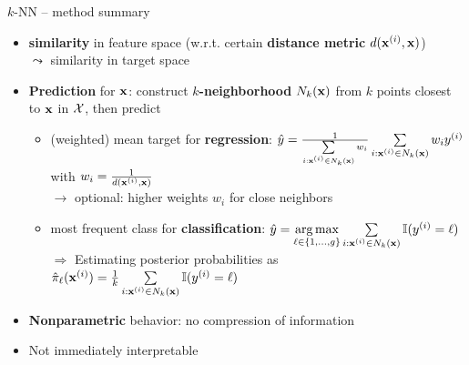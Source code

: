 \begin{frame}{$k$-NN -- method summary}

   
   

  \begin{itemize}
    \item \textbf{similarity} in feature space (w.r.t. certain \textbf{distance metric} $d(\mathbf{x}^{(i)},\mathbf{x})$) \\$\leadsto$ similarity in target space 
    \item \textbf{Prediction} for $\mathbf{x}$: construct \textbf{$k$-neighborhood} 
    $N_k(\mathbf{x})$ from $k$ points closest to $\mathbf{x}$ in $\mathcal{X}$, then 
    predict
    \begin{itemize} 
      \item (weighted) mean target for \textbf{regression}: 
      $\hat{y} = \tfrac{1}{\sum\limits_{i: \mathbf{x}^{(i)} \in N_k(\mathbf{x})} w_i}  
      \sum\limits_{i: \mathbf{x}^{(i)} \in N_k(\mathbf{x})} w_i y^{(i)} $  with $w_i = \tfrac{1}{d(\mathbf{x}^{(i)},\mathbf{x})}$\\
      $\rightarrow$ optional: higher weights $w_i$ for close neighbors
      \item most frequent class for \textbf{classification}: 
      $\hat{y} = \underset{\ell \in \{1, \ldots, g\}}{\mathrm{\mathop{\mathrm{arg\,max}}}} \sum\limits_{i: \mathbf{x}^{(i)} \in N_k(\mathbf{x})} \mathbb{I}(y^{(i)} = \ell)$\\
      $\Rightarrow$ Estimating posterior probabilities as $\hat{\pi}_{\ell}(\mathbf{x}^{(i)})= \frac{1}{k} \sum\limits_{i: \mathbf{x}^{(i)} \in N_k(\mathbf{x})} \mathbb{I}(y^{(i)} = \ell)$
    \end{itemize}
    \item \textbf{Nonparametric} behavior: no 
    compression of information
    \item Not immediately interpretable
  \end{itemize}

\end{frame}



